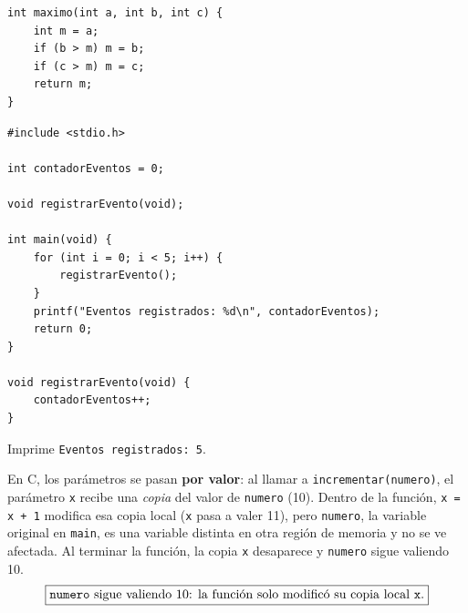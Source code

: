 \documentclass[11pt,letterpaper]{article}
\theoremstyle{definition}
\begin{document}
\begin{description}
\begin{lstlisting}
int maximo(int a, int b, int c) {
    int m = a;
    if (b > m) m = b;
    if (c > m) m = c;
    return m;
}
\end{lstlisting}

\item[\textbf{Ejercicio 5.}]
\begin{lstlisting}
#include <stdio.h>

int contadorEventos = 0;

void registrarEvento(void);

int main(void) {
    for (int i = 0; i < 5; i++) {
        registrarEvento();
    }
    printf("Eventos registrados: %d\n", contadorEventos);
    return 0;
}

void registrarEvento(void) {
    contadorEventos++;
}
\end{lstlisting}
Imprime \texttt{Eventos registrados: 5}.

\item[\textbf{Ejercicio 6.}]
En C, los parámetros se pasan \textbf{por valor}: al llamar a \texttt{incrementar(numero)}, el
parámetro \texttt{x} recibe una \emph{copia} del valor de \texttt{numero} (10). Dentro de la
función, \texttt{x = x + 1} modifica esa copia local (\texttt{x} pasa a valer 11), pero
\texttt{numero}, la variable original en \texttt{main}, es una variable distinta en otra región de
memoria y no se ve afectada. Al terminar la función, la copia \texttt{x} desaparece y
\texttt{numero} sigue valiendo 10.
\[\boxed{\text{\texttt{numero} sigue valiendo 10: la función solo modificó su copia local \texttt{x}.}}\]

\end{description}
\end{document}
